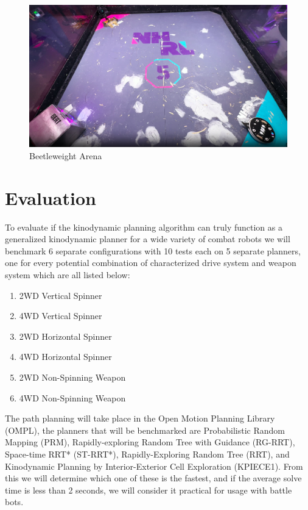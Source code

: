 \documentclass[conference]{IEEEtran}
\begin{document}
\begin{figure}[htp]
\centering
\includegraphics[scale=0.125]{arena.png}
\caption{Beetleweight Arena}
\label{Beetleweight Arena}
\end{figure}

\section{Evaluation}
To evaluate if the kinodynamic planning algorithm can truly function as a generalized kinodynamic planner for a wide variety of combat robots we will benchmark 6 separate configurations with 10 tests each on 5 separate planners, one for every potential combination of characterized drive system and weapon system which are all listed below:

\begin{enumerate}
\item{2WD Vertical Spinner}
\item{4WD Vertical Spinner}
\item{2WD Horizontal Spinner}
\item{4WD Horizontal Spinner}
\item{2WD Non-Spinning Weapon}
\item{4WD Non-Spinning Weapon}
\end{enumerate}


The path planning will take place in the Open Motion Planning Library (OMPL), the planners that will be benchmarked are Probabilistic Random Mapping (PRM), Rapidly-exploring Random Tree with Guidance (RG-RRT), Space-time RRT* (ST-RRT*), Rapidly-Exploring Random Tree (RRT), and Kinodynamic Planning by Interior-Exterior Cell Exploration (KPIECE1).  From this we will determine which one of these is the fastest, and if the average solve time is less than 2 seconds, we will consider it practical for usage with battle bots.
\end{document}
